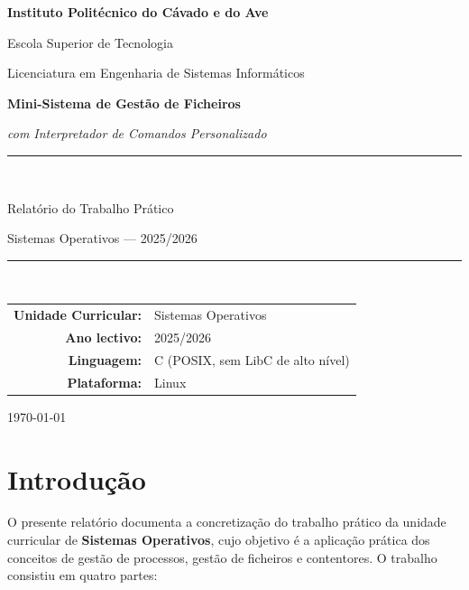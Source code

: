\documentclass[11pt,a4paper]{article}
\begin{document}
\begin{titlepage}
    \centering
    \vspace*{1.5cm}
    {\Large\bfseries Instituto Politécnico do Cávado e do Ave \par}
    {\large Escola Superior de Tecnologia \par}
    {\large Licenciatura em Engenharia de Sistemas Informáticos \par}

    \vspace{2.5cm}
    {\Huge\bfseries Mini-Sistema de Gestão de Ficheiros\par}
    \vspace{0.5cm}
    {\Large\itshape com Interpretador de Comandos Personalizado\par}

    \vspace{2cm}
    \rule{0.7\textwidth}{0.4pt}\\[0.3cm]
    {\large Relatório do Trabalho Prático\par}
    {\large Sistemas Operativos --- 2025/2026\par}
    \rule{0.7\textwidth}{0.4pt}\\[2cm]

    \begin{tabular}{rl}
        \textbf{Unidade Curricular:} & Sistemas Operativos \\
        \textbf{Ano lectivo:} & 2025/2026 \\
        \textbf{Linguagem:} & C (POSIX, sem LibC de alto nível) \\
        \textbf{Plataforma:} & Linux \\
    \end{tabular}

    \vfill
    {\large \today\par}
\end{titlepage}

\tableofcontents
\newpage

\section{Introdução}

O presente relatório documenta a concretização do trabalho prático da unidade curricular de \textbf{Sistemas Operativos}, cujo objetivo é a aplicação prática dos conceitos de gestão de processos, gestão de ficheiros e contentores. O trabalho consistiu em quatro partes:
\end{document}
